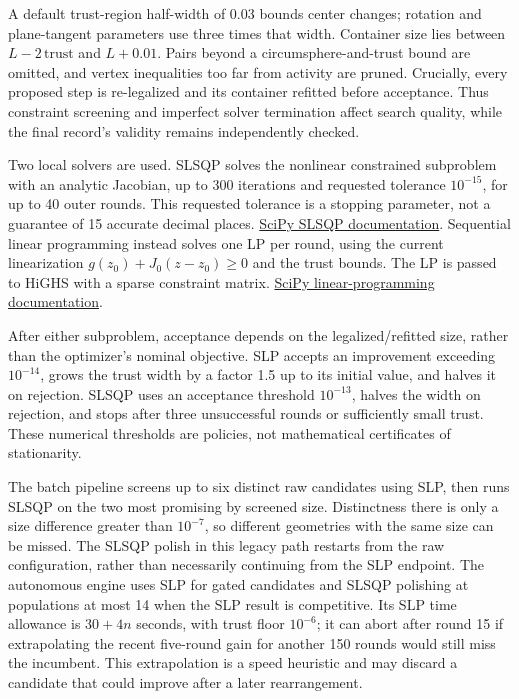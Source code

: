 \documentclass[11pt,a4paper]{article}
\begin{document}
A default trust-region half-width of 0.03 bounds center changes; rotation and plane-tangent parameters use three times that width. Container size lies between \(L-2\,\text{trust}\) and \(L+0.01\). Pairs beyond a circumsphere-and-trust bound are omitted, and vertex inequalities too far from activity are pruned. Crucially, every proposed step is re-legalized and its container refitted before acceptance. Thus constraint screening and imperfect solver termination affect search quality, while the final record's validity remains independently checked.

Two local solvers are used. SLSQP solves the nonlinear constrained subproblem with an analytic Jacobian, up to 300 iterations and requested tolerance \(10^{-15}\), for up to 40 outer rounds. This requested tolerance is a stopping parameter, not a guarantee of 15 accurate decimal places. \href{https://docs.scipy.org/doc/scipy/reference/optimize.minimize-slsqp.html}{SciPy SLSQP documentation}. Sequential linear programming instead solves one LP per round, using the current linearization \(g(z_0)+J_0(z-z_0)\ge0\) and the trust bounds. The LP is passed to HiGHS with a sparse constraint matrix. \href{https://docs.scipy.org/doc/scipy/reference/generated/scipy.optimize.linprog.html}{SciPy linear-programming documentation}.

After either subproblem, acceptance depends on the legalized/refitted size, rather than the optimizer's nominal objective. SLP accepts an improvement exceeding \(10^{-14}\), grows the trust width by a factor 1.5 up to its initial value, and halves it on rejection. SLSQP uses an acceptance threshold \(10^{-13}\), halves the width on rejection, and stops after three unsuccessful rounds or sufficiently small trust. These numerical thresholds are policies, not mathematical certificates of stationarity.

The batch pipeline screens up to six distinct raw candidates using SLP, then runs SLSQP on the two most promising by screened size. Distinctness there is only a size difference greater than \(10^{-7}\), so different geometries with the same size can be missed. The SLSQP polish in this legacy path restarts from the raw configuration, rather than necessarily continuing from the SLP endpoint. The autonomous engine uses SLP for gated candidates and SLSQP polishing at populations at most 14 when the SLP result is competitive. Its SLP time allowance is \(30+4n\) seconds, with trust floor \(10^{-6}\); it can abort after round 15 if extrapolating the recent five-round gain for another 150 rounds would still miss the incumbent. This extrapolation is a speed heuristic and may discard a candidate that could improve after a later rearrangement.
\end{document}
